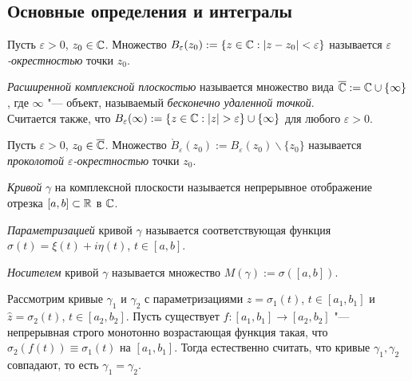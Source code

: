 \subsection*{Основные определения и интегралы}
\begin{definition}
	Пусть $\varepsilon > 0$, $z_0 \in \mathbb{C}$. Множество $B_\varepsilon(z_0) := \{z \in \mathbb{C}: |z - z_0| < \varepsilon\}$ называется \textit{$\varepsilon$-окрестностью} точки $z_0$.
\end{definition}


\begin{definition}
	\textit{Расширенной комплексной плоскостью} называется множество вида $\overline{\mathbb{C}} := \mathbb{C} \cup \{\infty\}$, где $\infty$ "--- объект, называемый \textit{бесконечно удаленной точкой}.  
 \\
 Считается также, что $B_\varepsilon(\infty) := \{z \in \mathbb{C}: |z| > \varepsilon\} \cup \{\infty\}$ для любого $\varepsilon > 0$.
\end{definition}

\begin{definition}
	Пусть $\varepsilon > 0$, $z_0 \in \overline{\mathbb{C}}$. Множество $\mathring B_\varepsilon(z_0) := B_\varepsilon(z_0) \backslash \{z_0\}$ называется \textit{проколотой $\varepsilon$-окрестностью} точки $z_0$.
\end{definition}

\begin{definition}
	\textit{Кривой} $\gamma$ на комплексной плоскости называется непрерывное отображение отрезка $[a, b] \subset \mathbb{R}$ в $\mathbb{C}$. 
 \end{definition}
 \begin{definition} \textit{Параметризацией} кривой $\gamma$ называется соответствующая 	функция $\sigma(t) = \xi(t) + i\eta(t)$, $t \in [a, b]$.
 \end{definition}
  \begin{definition} \textit{Носителем} кривой $\gamma$ называется множество $M(\gamma) := \sigma([a, b])$. 
\end{definition}

\begin{note}
	Рассмотрим кривые $\gamma_1$ и $\gamma_2$ с параметризациями $z = \sigma_1(t)$, $t \in [a_1, b_1]$ и $\widehat{z}= \sigma_2(t)$, $t \in [a_2, b_2]$. Пусть существует $f : [a_1, b_1] \to [a_2, b_2]$ "--- непрерывная строго монотонно возрастающая функция такая, что $\sigma_2(f(t)) \equiv \sigma_1(t)$ на $[a_1, b_1]$. Тогда естественно считать, что кривые $\gamma_1, \gamma_2$ совпадают, то есть $\gamma_1 = \gamma_2$.
\end{note}

